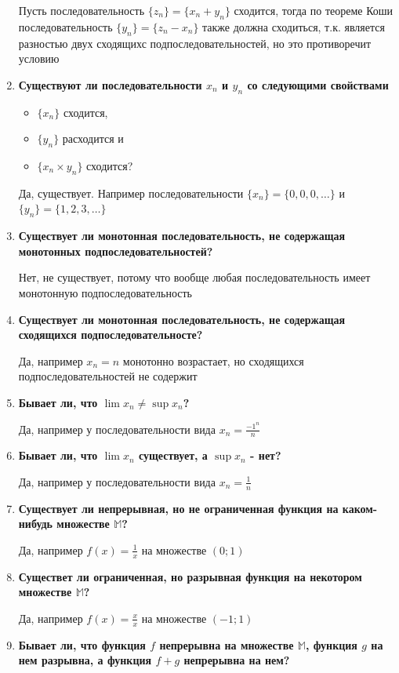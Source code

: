 \documentclass[a4paper,12pt]{article}
\begin{document}
\begin{enumerate}
{      Пусть последовательность $\{z_n\} = \{x_n + y_n\}$ сходится, тогда по теореме Коши
      последовательность $\{y_n\} = \{z_n - x_n\}$ также должна сходиться, т.к. является
      разностью двух сходящихс подпоследовательностей, но это противоречит условию
    }
    \item {
      \textbf{Существуют ли последовательности $x_n$ и $y_n$ со следующими свойствами}
      \begin{itemize}
        \item $\{x_n\}$ сходится,
        \item $\{y_n\}$ расходится и
        \item $\{x_n \times y_n\}$ сходится?
      \end{itemize}

      Да, существует. Например последовательности $\{x_n\} = \{0, 0, 0, \dots\}$ и
      $\{y_n\} = \{1, 2, 3, \dots\}$
    }
    \item {
      \textbf{Существует ли монотонная последовательность, не содержащая монотонных подпоследовательностей?}

      Нет, не существует, потому что вообще любая последовательность имеет монотонную подпоследовательность
    }
    \item {
      \textbf{Существует ли монотонная последовательность, не содержащая сходящихся подпоследовательносте?}

      Да, например $x_n = n$ монотонно возрастает, но сходящихся подпоследовательностей не содержит
    }
    \item {
      \textbf{Бывает ли, что $\lim{x_n} \neq \sup{x_n}$?}

      Да, например у последовательности вида $x_n = \frac{-1^n}{n}$
    }
    \item {
      \textbf{Бывает ли, что $\lim{x_n}$ существует, а $\sup{x_n}$ - нет?}

      Да, например у последовательности вида $x_n = \frac{1}{n}$
    }
    \item {
      \textbf{Существует ли непрерывная, но не ограниченная функция на каком-нибудь множестве $\mathbb{M}$?}

      Да, например $f(x) = \frac{1}{x}$ на множестве $(0; 1)$
    }
    \item {
      \textbf{Существет ли ограниченная, но разрывная функция на некотором множестве $\mathbb{M}$?}

      Да, например $f(x) = \frac{x}{x}$ на множестве $(-1; 1)$
    }
    \item {
      \textbf{Бывает ли, что функция $f$ непрерывна на множестве $\mathbb{M}$, функция $g$ на нем разрывна, а функция $f + g$ непрерывна на нем?}

}
\end{enumerate}
\end{document}
